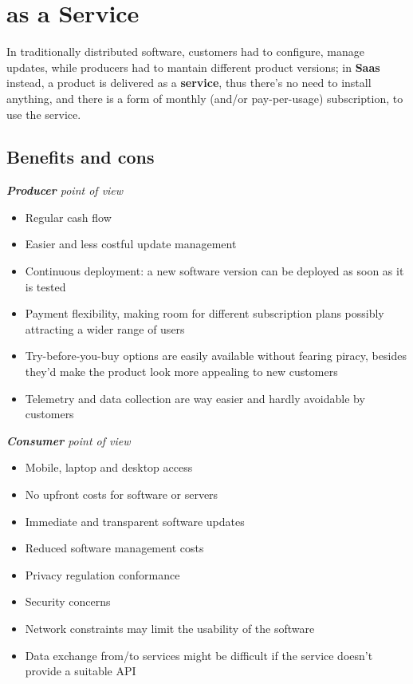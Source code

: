 \chapter{as a Service}

In traditionally distributed software,
customers had to configure, manage updates, while producers had to mantain different product versions; 
in \textbf{Saas} instead,
a product is delivered as a \textbf{service}, thus there's no need to install anything,
and there is a form of monthly (and/or pay-per-usage) subscription, to use the service.

\section{Benefits and cons}
\textit{\textbf{Producer} point of view}
\begin{itemize}
   \color{darkgreen}
   \item Regular cash flow
   \item Easier and less costful update management
   \item Continuous deployment: a new software version can be deployed as soon as it is tested
   \item Payment flexibility, making room for different subscription plans possibly attracting a wider range of users
   \item Try-before-you-buy options are easily available without fearing piracy, besides they'd make the product look more appealing to new customers
   \item Telemetry and data collection are way easier and hardly avoidable by customers   
\end{itemize}

\textit{\textbf{Consumer} point of view}
\begin{itemize}
   \color{darkgreen}
   \item Mobile, laptop and desktop access
   \item No upfront costs for software or servers
   \item Immediate and transparent software updates
   \item Reduced software management costs
\end{itemize}
\begin{itemize}
   \color{darkred}
   \item Privacy regulation conformance
   \item Security concerns
   \item Network constraints may limit the usability of the software
   \item Data exchange from/to services might be difficult if the service doesn't provide a suitable API
\end{itemize}

